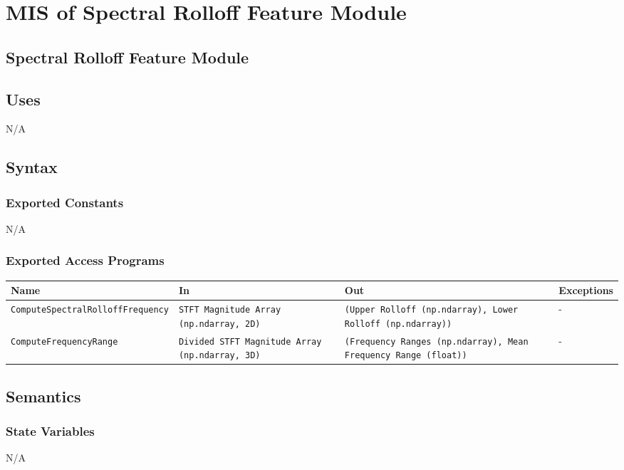 \documentclass[12pt, titlepage]{article}
\begin{document}
{\color{red}
\section{MIS of Spectral Rolloff Feature Module}

\subsection{Spectral Rolloff Feature Module}

\subsection{Uses}
N/A

\subsection{Syntax}

\subsubsection{Exported Constants}
N/A

\subsubsection{Exported Access Programs}

\begin{center}
  \begin{tabular}{|p{7cm}|p{3cm}|p{3cm}|p{2cm}|}
  \hline
  \textbf{Name} & \textbf{In} & \textbf{Out} & \textbf{Exceptions} \\
  \hline
  \texttt{ComputeSpectralRolloffFrequency} & \texttt{STFT Magnitude Array (np.ndarray, 2D)} & \texttt{(Upper Rolloff (np.ndarray), Lower Rolloff (np.ndarray))} & - \\
  \hline
  \texttt{ComputeFrequencyRange} & \texttt{Divided STFT Magnitude Array (np.ndarray, 3D)} & \texttt{(Frequency Ranges (np.ndarray), Mean Frequency Range (float))} & - \\
  \hline
  \end{tabular}
\end{center}

\subsection{Semantics}

\subsubsection{State Variables}
N/A

}
\end{document}
